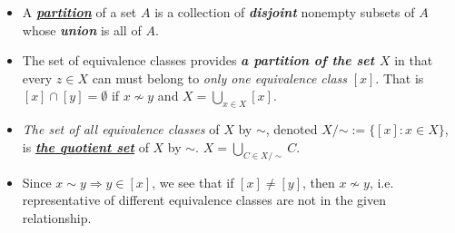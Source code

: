 \documentclass[11pt]{article}
\begin{document}
\begin{itemize}
\item \begin{definition}
A \underline{\textbf{\emph{partition}}} of a set $A$ is a collection of \textbf{\emph{disjoint}} nonempty subsets of $A$ whose \textbf{\emph{union}} is all of $A$.
\end{definition}

\item \begin{remark}
The set of equivalence classes provides \emph{\textbf{a partition of the set $X$}} in that every $z \in X$ can must belong to \emph{only one equivalence class} $[x]$. That is $[x] \cap [y] = \emptyset$ if $x \not\sim y$ and $X = \bigcup_{x \in X}[x]$.
\end{remark}

\item \begin{definition}
\emph{The set of all equivalence classes} of $X$ by $\sim$, denoted $X/{\mathord {\sim }}:= \{[x]: x \in X \}$, is \underline{\emph{\textbf{the quotient set}}} of $X$ by $\sim$.  $X = \bigcup_{C \in X/\sim}C.$
\end{definition}

\item \begin{remark}
Since $x \sim y \Rightarrow y \in [x]$, we see that if $[x] \neq [y]$, then $x \not\sim y$, i.e. representative of different equivalence classes are not in the given relationship.
\end{remark}
\end{itemize}
\end{document}
